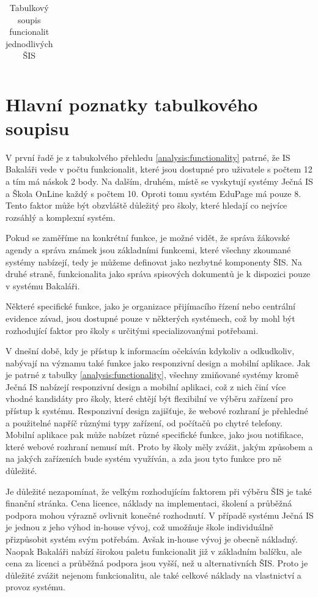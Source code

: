 \documentclass[FM,Proj]{tulthesis}
\begin{document}
\begin{table}[h]
\begin{tabular}{lcccc}
    \end{tabular}
    \caption{Tabulkový soupis funcionalit jednodlivých ŠIS}
    \label{analysis:funcionality}
\end{table}

\section{Hlavní poznatky tabulkového soupisu}
V první řadě je z tabukolvého přehledu \ref{analysis:functionality} patrné, že IS Bakaláři
vede v počtu funkcionalit, které jsou dostupné pro uživatele s počtem 12 a tím má náskok 2
body. Na dalším, druhém, místě se vyskytují systémy Ječná IS a Škola OnLine každý s počtem 10. 
Oproti tomu systém EduPage má pouze 8. Tento
faktor může být obzvláště důležitý pro školy, které hledají co nejvíce rozsáhlý a komplexní systém.

Pokud se zaměříme na konkrétní funkce, je možné vidět, že správa žákovské agendy a správa známek
jsou základními funkcemi, které všechny zkoumané systémy nabízejí, tedy je můžeme definovat 
jako nezbytné komponenty ŠIS. Na druhé straně, funkcionalita jako správa spisových dokumentů je k dispozici pouze v systému
Bakaláři.

Některé specifické funkce, jako je organizace přijímacího řízení nebo
centrální evidence závad, jsou dostupné pouze v některých systémech, což by mohl
být rozhodující faktor pro školy s určitými specializovanými potřebami.

V dnešní době, kdy je přístup k informacím očekáván kdykoliv
a odkudkoliv, nabývají na významu také funkce jako responzivní 
design a mobilní aplikace. Jak je patrné z tabulky \ref{analysis:functionality},
všechny zmiňované systémy kromě Ječná IS nabízejí responzivní design a mobilní
aplikaci, což z nich činí více vhodné kandidáty pro školy, které chtějí
být flexibilní ve výběru zařízení pro přístup k systému.
Responzivní design zajišťuje, že webové rozhraní je přehledné
a použitelné napříč různými typy zařízení, od počítačů po chytré telefony.
Mobilní aplikace pak může nabízet různé specifické funkce, jako jsou
notifikace, které webové rozhraní nemusí mít. Proto by školy měly zvážit,
jakým způsobem a na jakých zařízeních bude systém využíván, a zda
jsou tyto funkce pro ně důležité. 

Je důležité nezapomínat, že velkým rozhodujícím faktorem při výběru
ŠIS je také finanční stránka. Cena licence, náklady na implementaci, školení a průběžná
podpora mohou výrazně ovlivnit konečné rozhodnutí. V případě systému Ječná IS je jednou
z jeho výhod in-house vývoj, což umožňuje škole individuálně přizpůsobit systém svým
potřebám. Avšak in-house vývoj je obecně nákladný. Naopak Bakaláři nabízí širokou paletu funkcionalit
již v základním balíčku, ale cena za licenci a průběžná podpora jsou vyšší, než u alternativních ŠIS.
Proto je důležité zvážit nejenom funkcionalitu, ale také celkové náklady
na vlastnictví a provoz systému.
\end{document}
